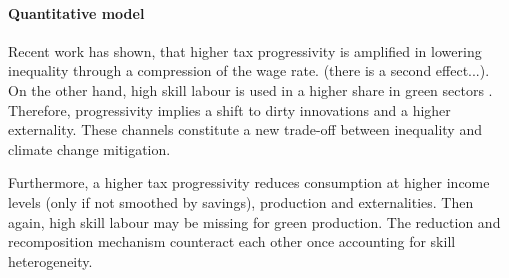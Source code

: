 



\paragraph{Quantitative model}
Recent work has shown, that  higher tax progressivity is amplified in lowering inequality through a compression of the wage rate. (there is a second effect...). On the other hand, high skill labour is used in a higher share in green sectors \cite{Consoli2016DoCapital}. Therefore, progressivity implies a shift to dirty innovations and a higher externality. These channels constitute a new trade-off between inequality and climate change mitigation. 

Furthermore, a higher tax progressivity reduces consumption at higher income levels (only if not smoothed by savings), production and externalities. Then again, high skill labour may be missing for green production. The reduction and recomposition mechanism counteract each other once accounting for skill heterogeneity. 


